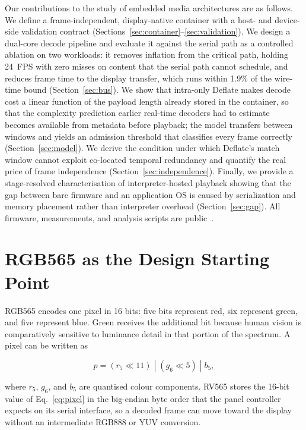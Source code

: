 \documentclass[11pt,twocolumn]{article}
\newcommand{\system}{RV565}
\begin{document}
Our contributions to the study of embedded media architectures are as
follows.  We define a frame-independent, display-native container with a
host- and device-side validation contract
(Sections~\ref{sec:container}--\ref{sec:validation}).  We design a dual-core
decode pipeline and evaluate it against the serial path as a controlled
ablation on two workloads: it removes inflation from the critical path,
holding 24~FPS with zero misses on content that the serial path cannot
schedule, and reduces frame time to the display transfer, which runs within
1.9\% of the wire-time bound (Section~\ref{sec:bus}).  We show that
intra-only Deflate makes decode cost a linear function of the payload length
already stored in the container, so that the complexity prediction earlier
real-time decoders had to estimate~\cite{mattavelli1998implementing} becomes
available from metadata before playback; the model transfers between windows
and yields an admission threshold that classifies every frame correctly
(Section~\ref{sec:model}).  We derive the condition under which Deflate's
match window cannot exploit co-located temporal redundancy and quantify the
real price of frame independence (Section~\ref{sec:independence}).  Finally,
we provide a stage-resolved characterisation of interpreter-hosted playback
showing that the gap between bare firmware and an application OS is caused by
serialization and memory placement rather than interpreter overhead
(Section~\ref{sec:gap}).  All firmware, measurements, and analysis scripts
are public~\cite{bhattacharya2026oreo}.

\section{RGB565 as the Design Starting Point}

RGB565 encodes one pixel in 16 bits: five bits represent red, six represent
green, and five represent blue.  Green receives the additional bit because
human vision is comparatively sensitive to luminance detail in that portion
of the spectrum.  A pixel can be written as

\begin{equation}
p=(r_5 \ll 11)\;|\;(g_6 \ll 5)\;|\;b_5,
\label{eq:pixel}
\end{equation}

where $r_5$, $g_6$, and $b_5$ are quantised colour components.  \system{}
stores the 16-bit value of Eq.~\eqref{eq:pixel} in the big-endian byte order
that the panel controller expects on its serial interface, so a decoded frame
can move toward the display without an intermediate RGB888 or YUV conversion.
\end{document}
